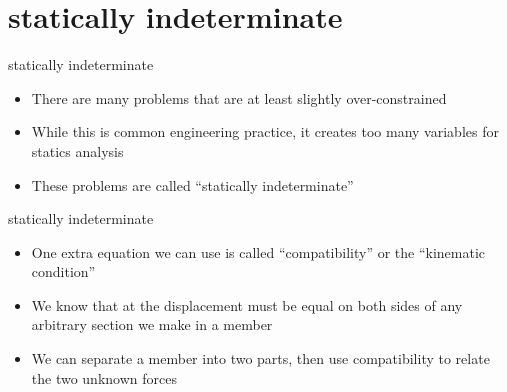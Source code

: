 \documentclass[
  letterpaper,
  ignorenonframetext,
  aspectratio=43,
  handout,
  12pt]{beamer}
\providecommand{\tightlist}{%
  \setlength{\itemsep}{0pt}\setlength{\parskip}{0pt}}
\providecommand{\tightlist}{%
\setlength{\itemsep}{0pt}\setlength{\parskip}{0pt}}
\begin{document}
\hypertarget{statically-indeterminate}{%
\section{statically indeterminate}\label{statically-indeterminate}}

\begin{frame}{statically indeterminate}
\protect\hypertarget{statically-indeterminate-1}{}
\begin{itemize}
\tightlist
\item
  There are many problems that are at least slightly over-constrained
\item
  While this is common engineering practice, it creates too many
  variables for statics analysis
\item
  These problems are called ``statically indeterminate''
\end{itemize}
\end{frame}

\begin{frame}{statically indeterminate}
\protect\hypertarget{statically-indeterminate-2}{}
\begin{itemize}
\tightlist
\item
  One extra equation we can use is called ``compatibility'' or the
  ``kinematic condition''
\item
  We know that at the displacement must be equal on both sides of any
  arbitrary section we make in a member
\item
  We can separate a member into two parts, then use compatibility to
  relate the two unknown forces
\end{itemize}
\end{frame}
\end{document}
